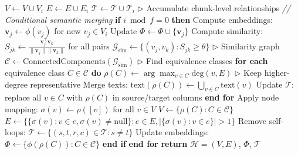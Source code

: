 \documentclass{article}
\begin{document}
\begin{algorithm}
\begin{algorithmic}[1]
\STATE \quad $V \leftarrow V \cup V_i$
\STATE \quad $E \leftarrow E \cup E_i$ 
\STATE \quad $\mathcal{T} \leftarrow \mathcal{T} \cup \mathcal{T}_i$ \hfill $\triangleright$ Accumulate chunk-level relationships
\vspace{1mm}
\STATE \quad \textit{// Conditional semantic merging}
\STATE \quad \textbf{if} $i \bmod f = 0$ \textbf{then}
\STATE \quad \quad Compute embeddings: $\mathbf{v}_j \leftarrow \phi(v_j)$ for new $v_j \in V_i$ 
\STATE \quad \quad Update $\Phi \leftarrow \Phi \cup \{\mathbf{v}_j\}$
\STATE \quad \quad Compute similarity: $S_{jk} \leftarrow \displaystyle\frac{\mathbf{v}_j^\top \mathbf{v}_k}{\|\mathbf{v}_j\| \|\mathbf{v}_k\|}$ for all pairs
\STATE \quad \quad $\mathcal{G}_{\text{sim}} \leftarrow \{(v_j, v_k) : S_{jk} \geq \theta\}$ \hfill $\triangleright$ Similarity graph
\STATE \quad \quad $\mathcal{C} \leftarrow \text{ConnectedComponents}(\mathcal{G}_{\text{sim}})$ \hfill $\triangleright$ Find equivalence classes
\STATE \quad \quad \textbf{for each} equivalence class $C \in \mathcal{C}$ \textbf{do}
\STATE \quad \quad \quad $\rho(C) \leftarrow \arg\max_{v \in C} \text{deg}(v, E)$ \hfill $\triangleright$ Keep higher-degree representative
\STATE \quad \quad \quad Merge texts: $\text{text}(\rho(C)) \leftarrow \bigcup_{v \in C} \text{text}(v)$ 
\STATE \quad \quad \quad Update $\mathcal{T}$: replace all $v \in C$ with $\rho(C)$ in source/target columns
\STATE \quad \quad \textbf{end for}
\STATE \quad \quad Apply node mapping: $\sigma(v) \leftarrow \rho([v])$ for all $v \in V$
\STATE \quad \quad $V \leftarrow \{\rho(C) : C \in \mathcal{C}\}$
\STATE \quad \quad $E \leftarrow \{\{\sigma(v) : v \in e, \sigma(v) \neq \text{null}\} : e \in E, |\{\sigma(v) : v \in e\}| > 1\}$
\STATE \quad \quad Remove self-loops: $\mathcal{T} \leftarrow \{(s,t,r,c) \in \mathcal{T} : s \neq t\}$
\STATE \quad \quad Update embeddings: $\Phi \leftarrow \{\phi(\rho(C)) : C \in \mathcal{C}\}$
\STATE \quad \textbf{end if}
\STATE \textbf{end for}
\STATE \textbf{return} $\mathcal{H} = (V, E)$, $\Phi$, $\mathcal{T}$
\end{algorithmic}
\end{algorithm}




\end{document}
